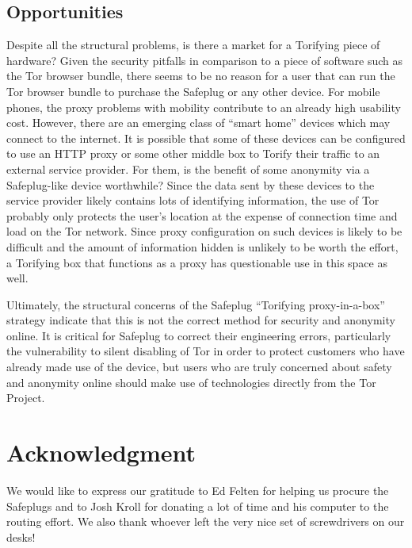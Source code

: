 \documentclass[conference]{IEEEtran}
\begin{document}
\subsection{Opportunities}
Despite all the structural problems, is there a market for a Torifying piece of hardware?  Given the security pitfalls in comparison to a piece of software such as the Tor browser bundle, there seems to be no reason for a user that can run the Tor browser bundle to purchase the Safeplug or any other device.  For mobile phones, the proxy problems with mobility contribute to an already high usability cost.  However, there are an emerging class of ``smart home'' devices which may connect to the internet.  It is possible that some of these devices can be configured to use an HTTP proxy or some other middle box to Torify their traffic to an external service provider.  For them, is the benefit of some anonymity via a Safeplug-like device worthwhile?  Since the data sent by these devices to the service provider likely contains lots of identifying information, the use of Tor probably only protects the user's location at the expense of connection time and load on the Tor network.  Since proxy configuration on such devices is likely to be difficult and the amount of information hidden is unlikely to be worth the effort, a Torifying box that functions as a proxy has questionable use in this space as well.

Ultimately, the structural concerns of the Safeplug ``Torifying proxy-in-a-box'' strategy indicate that this is not the correct method for security and anonymity online.  It is critical for Safeplug to correct their engineering errors, particularly the vulnerability to silent disabling of Tor in order to protect customers who have already made use of the device, but users who are truly concerned about safety and anonymity online should make use of technologies directly from the Tor Project.





\section*{Acknowledgment}
We would like to express our gratitude to Ed Felten for helping us procure the Safeplugs and to Josh Kroll for donating a lot of time and his computer to the routing effort.  We also thank whoever left the very nice set of screwdrivers on our desks!
\end{document}
